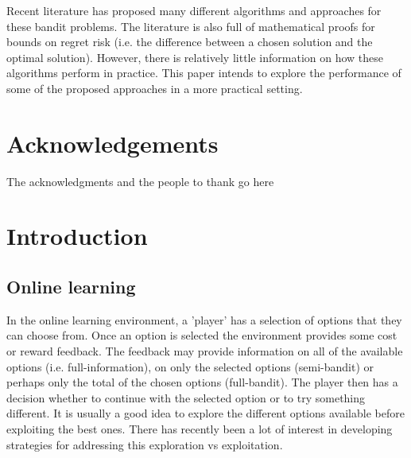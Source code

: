 Recent literature has proposed many different algorithms and approaches for these bandit problems. The literature is also full of mathematical proofs for bounds on regret risk (i.e. the difference between a chosen solution and the optimal solution). However, there is relatively little information on how these algorithms perform in practice. This paper intends to explore the performance of some of the proposed approaches in a more practical setting. 

\pagebreak

\vfill %


\section{Acknowledgements}
The acknowledgments and the people to thank go here

\pagebreak


\tableofcontents %

\pagebreak


\section{Introduction}

\subsection{Online learning}

In the online learning environment, a 'player' has a selection of options that they can choose from. Once an option is selected the environment provides some cost or reward feedback. The feedback may provide information on all of the available options (i.e. full-information), on only the selected options (semi-bandit) or perhaps only the total of the chosen options (full-bandit). The player then has a decision whether to continue with the selected option or to try something different. It is usually a good idea to explore the different options available before exploiting the best ones. There has recently been a lot of interest in developing strategies for addressing this exploration vs exploitation.\\

